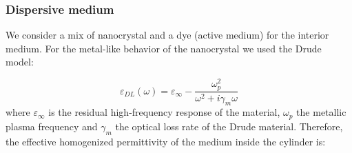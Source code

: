 \documentclass[9pt,twocolumn,twoside]{osajnl}
\begin{document}









\subsubsection{Dispersive medium}

We consider a mix of nanocrystal and a dye (active medium) for the interior medium. For the metal-like behavior of the nanocrystal we used the Drude model:

\begin{equation}
\label{eq drude lorentz}
\varepsilon_{DL}(\omega) = \varepsilon_\infty - \dfrac{\omega^2_p}{\omega^2 + i\gamma_m \omega}    
\end{equation}
where $\varepsilon_\infty$ is the residual high-frequency response of the material, $\omega_p$ the metallic plasma frequency and $\gamma_m$ the optical loss rate of the Drude material. Therefore, the effective homogenized permittivity of the medium inside the cylinder is:
\end{document}
